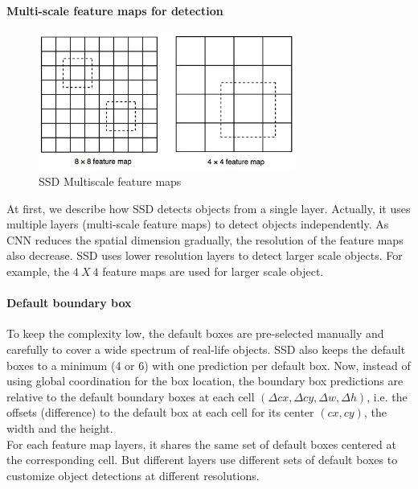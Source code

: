 \documentclass[12pt]{article}
\begin{document}
\paragraph{Multi-scale feature maps for detection}
\begin{figure}[h]
    \centering
    \includegraphics[width=0.75\textwidth]{images/ssd_lh_res.png}
    \caption{SSD Multiscale feature maps}
    \label{fig:ssd3}
\end{figure}
{
\fontsize{12}{14}\selectfont
At first, we describe how SSD detects objects from a single layer. Actually, it uses multiple layers (multi-scale feature maps) to detect objects independently. As CNN reduces the spatial dimension gradually, the resolution of the feature maps also decrease. SSD uses lower resolution layers to detect larger scale objects. For example, the $4\ X\ 4$ feature maps are used for larger scale object.
}

\paragraph{Default boundary box}
{
\fontsize{12}{14}\selectfont
To keep the complexity low, the default boxes are pre-selected manually and carefully to cover a wide spectrum of real-life objects. SSD also keeps the default boxes to a minimum (4 or 6) with one prediction per default box. Now, instead of using global coordination for the box location, the boundary box predictions are relative to the default boundary boxes at each cell $(\Delta cx, \Delta cy, \Delta w, \Delta h)$, i.e. the offsets (difference) to the default box at each cell for its center $(cx, cy)$, the width and the height.
\\
For each feature map layers, it shares the same set of default boxes centered at the corresponding cell. But different layers use different sets of default boxes to customize object detections at different resolutions.
}
\end{document}

